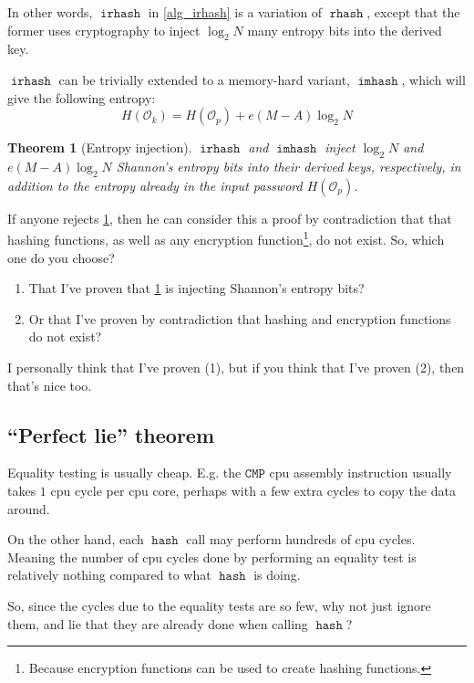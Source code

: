 \documentclass[twocolumn]{article}
\newtheorem{theorem}{Theorem}[section]
\DeclareMathOperator{\hash}{\mathtt{hash}}
\DeclareMathOperator{\rhash}{\mathtt{rhash}}
\DeclareMathOperator{\irhash}{\mathtt{irhash}}
\DeclareMathOperator{\imhash}{\mathtt{imhash}}
\begin{document}
In other words, $\irhash$ in \cref{alg_irhash} is a variation of $\rhash$,
except that the former uses cryptography to inject $\log_2 N$ many entropy
bits into the derived key.

$\irhash$ can be trivially extended to a memory-hard variant, $\imhash$,
which will give the following entropy:
\begin{equation}
    H(\mathcal{O}_k) = H(\mathcal{O}_p) + e(M-A)\log_2 N
\end{equation}

\begin{theorem}[Entropy injection]\label{theorem_entropy_injection}
    $\irhash$ and $\imhash$ inject $\log_2 N$ and $e(M-A)\log_2 N$
    Shannon's entropy bits into their derived keys, respectively, in
    addition to the entropy already in the input password
    $H(\mathcal{O}_p)$.
\end{theorem}

If anyone rejects \cref{theorem_entropy_injection}, then he can consider
this a proof by contradiction that that hashing functions, as well as any
encryption function\footnote{Because encryption functions can be used to
create hashing functions.}, do not exist.  So, which one do you choose?  
\begin{enumerate}
    \item That I've proven that \cref{theorem_entropy_injection} is
    injecting Shannon's entropy bits?

    \item Or that I've proven by contradiction that hashing and encryption
    functions do not exist?
\end{enumerate}

I personally think that I've proven (1), but if you think that I've proven
(2), then that's nice too.

\subsection{``Perfect lie'' theorem}
Equality testing is usually cheap.  E.g. the $\texttt{CMP}$ \gls{cpu}
assembly instruction usually takes $1$ \gls{cpu} cycle per \gls{cpu} core,
perhaps with a few extra cycles to copy the data around.  

On the other hand, each $\hash$ call may perform hundreds of \gls{cpu}
cycles.  Meaning the number of \gls{cpu} cycles done by performing an
equality test is relatively nothing compared to what $\hash$ is doing.

So, since the cycles due to the equality tests are so few, why not just
ignore them, and lie that they are already done when calling $\hash$?
\end{document}
